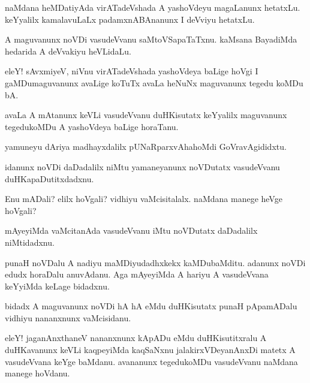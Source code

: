 \begin{mng}
naMdana heMDatiyAda virATadeVshada A yashoVdeyu magaLanunx hetatxLu. keYyalilx kamalavuLaLx padamxnABAnanunx I deVviyu hetatxLu.
\end{mng}

\begin{mng}
A maguvanunx noVDi vasudeVvanu saMtoVSapaTaTxnu. kaMsana BayadiMda hedarida A deVvakiyu heVLidaLu.
\end{mng}

\begin{mng}
eleY! sAvxmiyeV, niVnu virATadeVshada yashoVdeya baLige hoVgi I gaMDumaguvanunx avaLige koTuTx avaLa heNuNx maguvanunx tegedu koMDu bA.
\end{mng}

\begin{mng}
avaLa A mAtanunx keVLi vasudeVvanu duHKisutatx keYyalilx maguvanunx tegedukoMDu A yashoVdeya baLige horaTanu.
\end{mng}

\begin{mng}
yamuneyu dAriya madhayxdalilx pUNaRparxvAhahoMdi GoVravAgididxtu.
\end{mng}

\begin{mng}
idanunx noVDi daDadalilx niMtu yamaneyanunx noVDutatx vasudeVvanu duHKapaDutitxdadxnu.
\end{mng}

\begin{mng}
Enu mADali? elilx hoVgali? vidhiyu vaMcisitalalx. naMdana manege heVge hoVgali?
\end{mng}

\begin{mng}
mAyeyiMda vaMcitanAda vasudeVvanu iMtu noVDutatx daDadalilx niMtidadxnu.
\end{mng}

\begin{mng}
punaH noVDalu A nadiyu maMDiyudadhxkekx kaMDubaMditu. adanunx noVDi edudx horaDalu anuvAdanu. Aga mAyeyiMda A hariyu A vasudeVvana keYyiMda keLage bidadxnu.
\end{mng}

\begin{mng}
bidadx A maguvanunx noVDi hA hA eMdu duHKisutatx punaH pApamADalu vidhiyu nananxnunx vaMcisidanu.
\end{mng}

\begin{mng}
eleY! jaganAnxthaneV nananxnunx kApADu eMdu duHKisutitxralu A duHKavanunx keVLi kaqpeyiMda kaqSaNxnu jalakirxVDeyanAnxDi matetx A vasudeVvana keYge baMdanu. avananunx tegedukoMDu vasudeVvanu naMdana manege hoVdanu.
\end{mng}

